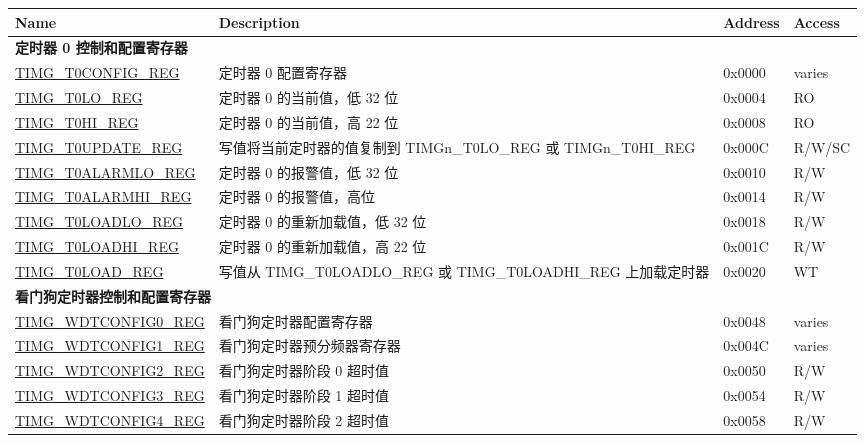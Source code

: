 \begin{longtable}{ | p{6cm} | p{7.0cm} | p{1.3cm} | p{1.7cm} | }
\hline\rowcolor{lightgray}
Name & Description &  Address & Access \\ \hline
\endhead
\multicolumn{4}{|l|}{\textbf{定时器 0 控制和配置寄存器}} \\ \hline
\hyperref[regdesc:TIMGTXCONFIGREG]{TIMG\_T0CONFIG\_REG} & 定时器 0 配置寄存器 & 0x0000 & varies \\ \hline
\hyperref[regdesc:TIMGTXLOREG]{TIMG\_T0LO\_REG} & 定时器 0 的当前值，低 32 位 & 0x0004 & RO \\ \hline
\hyperref[regdesc:TIMGTXHIREG]{TIMG\_T0HI\_REG} & 定时器 0 的当前值，高 22 位 & 0x0008 & RO \\ \hline
\hyperref[regdesc:TIMGTXUPDATEREG]{TIMG\_T0UPDATE\_REG} & 写值将当前定时器的值复制到 TIMGn\_T0LO\_REG 或 TIMGn\_T0HI\_REG & 0x000C & R/W/SC \\ \hline
\hyperref[regdesc:TIMGTXALARMLOREG]{TIMG\_T0ALARMLO\_REG} & 定时器 0 的报警值，低 32 位 & 0x0010 & R/W \\ \hline
\hyperref[regdesc:TIMGTXALARMHIREG]{TIMG\_T0ALARMHI\_REG} & 定时器 0 的报警值，高位 & 0x0014 & R/W \\ \hline
\hyperref[regdesc:TIMGTXLOADLOREG]{TIMG\_T0LOADLO\_REG} & 定时器 0 的重新加载值，低 32 位 & 0x0018 & R/W \\ \hline
\hyperref[regdesc:TIMGTXLOADHIREG]{TIMG\_T0LOADHI\_REG} & 定时器 0 的重新加载值，高 22 位 & 0x001C & R/W \\ \hline
\hyperref[regdesc:TIMGTXLOADREG]{TIMG\_T0LOAD\_REG} & 写值从 TIMG\_T0LOADLO\_REG 或 TIMG\_T0LOADHI\_REG 上加载定时器 & 0x0020 & WT \\ \hline
\multicolumn{4}{|l|}{\textbf{看门狗定时器控制和配置寄存器}} \\ \hline
\hyperref[regdesc:TIMGWDTCONFIG0REG]{TIMG\_WDTCONFIG0\_REG} & 看门狗定时器配置寄存器 & 0x0048 & varies \\ \hline
\hyperref[regdesc:TIMGWDTCONFIG1REG]{TIMG\_WDTCONFIG1\_REG} & 看门狗定时器预分频器寄存器 & 0x004C & varies \\ \hline
\hyperref[regdesc:TIMGWDTCONFIG2REG]{TIMG\_WDTCONFIG2\_REG} & 看门狗定时器阶段 0 超时值 & 0x0050 & R/W \\ \hline
\hyperref[regdesc:TIMGWDTCONFIG3REG]{TIMG\_WDTCONFIG3\_REG} & 看门狗定时器阶段 1 超时值 & 0x0054 & R/W \\ \hline
\hyperref[regdesc:TIMGWDTCONFIG4REG]{TIMG\_WDTCONFIG4\_REG} & 看门狗定时器阶段 2 超时值 & 0x0058 & R/W \\ \hline

\end{longtable}
